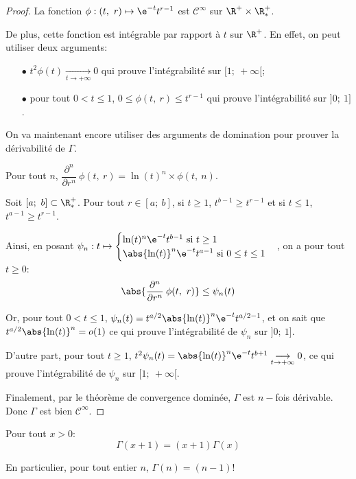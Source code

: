 \begin{proof}
La fonction $ \phi: (t,~r) \mapsto \e^{-t} t^{r-1}$ est $\mathcal{C}^{\infty}$ sur $\R^{+} \times \R^{+}_{*}$.

De plus, cette fonction est intégrable par rapport à $t$ sur $\R^+$. En effet, on peut utiliser deux arguments:
\begin{itemize}
\item[$\bullet$] $t^2 \phi(t) \underset{t \to +\infty}{\longrightarrow} 0$ qui prouve l'intégrabilité sur $[1;~+\infty[$;
\item[$\bullet$] pour tout $0 < t \leq 1$, $0 \leq \phi(t,~r) \leq t^{r-1}$ qui prouve l'intégrabilité sur $]0;~1]$.
\end{itemize}

On va maintenant encore utiliser des arguments de domination pour prouver la dérivabilité de $\Gamma$.

Pour tout $n$, $\dfrac{\partial^n }{\partial r^n} \: \phi(t,~r) = \ln(t)^n \times \phi(t,~n)$.

Soit $[a;~b] \subset \R^{+}_{*}$. Pour tout $r \in [a;~b]$, si $t \geq 1$, $t^{b-1} \geq t^{r-1}$ et si $t \leq 1$, $t^{a-1} \geq t^{r-1}$.


Ainsi, en posant $\psi_n: t \mapsto \begin{cases} \ln(t)^n \e^{-t} t^{b-1} \text{ si }t \geq 1 \\ \abs{\ln(t)}^n \e^{-t} t^{a-1} \text{ si }0 \leq t \leq 1\end{cases}$, on a pour tout $t \geq 0$:
\[
\abs{\dfrac{\partial^n }{\partial r^n} \: \phi(t,~r)} \leq \psi_n(t)
\]

Or, pour tout $0 < t \leq 1$, $\psi_n(t) = t^{a/2} \abs{\ln(t)}^n \e^{-t} t^{a/2-1}$, et on sait que $t^{a/2} \abs{\ln(t)}^n = o(1)$ ce qui prouve l'intégrabilité de $\psi_n$ sur $]0;~1]$.

D'autre part, pour tout $t \geq 1$, $t^2 \psi_n(t) = \abs{\ln(t)}^n \e^{-t} t^{b+1} \underset{t \to +\infty}{\longrightarrow} 0$, ce qui prouve l'intégrabilité de $\psi_n$ sur $[1;~+\infty[$.

Finalement, par le théorème de convergence dominée, $\Gamma$ est $n-$fois dérivable. Donc $\Gamma$ est bien $\mathcal{C}^{\infty}$.
\end{proof}

\begin{prop}
Pour tout $x>0$:
\[\Gamma(x+1)=(x+1) \Gamma(x)\]

En particulier, pour tout entier $n$, $\Gamma(n)=(n-1)!$
\end{prop}

